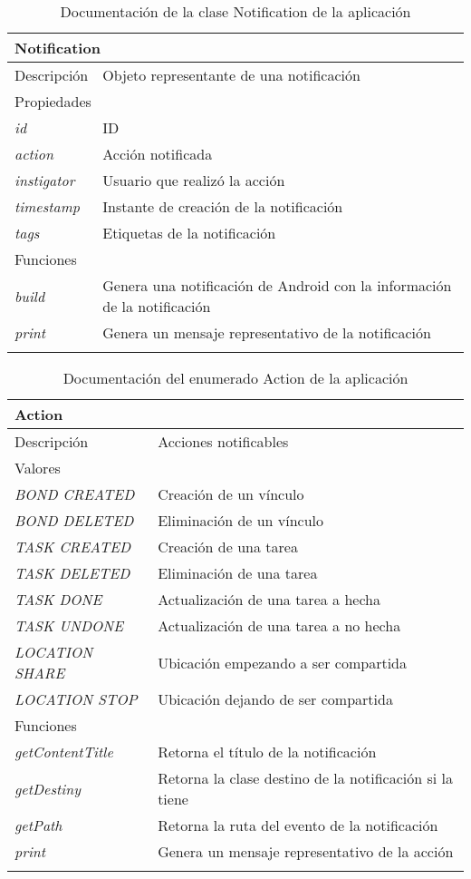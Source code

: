 \begin{longtable}{|p{} p{}|}
    \hline
    \multicolumn{2}{|l|}{\textbf{Notification}} \\ \hline \hline
    Descripción      & Objeto representante de una notificación \\ \hline
    \multicolumn{2}{|l|}{Propiedades} \\
    \emph{id}  & ID \\
    \emph{action}  & Acción notificada \\
    \emph{instigator} & Usuario que realizó la acción \\
    \emph{timestamp}  & Instante de creación de la notificación \\
    \emph{tags}  & Etiquetas de la notificación \\  \hline
    \multicolumn{2}{|l|}{Funciones} \\
    \emph{build}  & Genera una notificación de Android con la información de la notificación \\
    \emph{print}  & Genera un mensaje representativo de la notificación \\  \hline
    \caption{Documentación de la clase Notification de la aplicación}
    \label{dis:app:notification}
\end{longtable}

\begin{longtable}{|p{} p{}|}
    \hline
    \multicolumn{2}{|l|}{\textbf{Action}} \\ \hline \hline
    Descripción      & Acciones notificables \\ \hline
    \multicolumn{2}{|l|}{Valores} \\
    \emph{BOND CREATED}  & Creación de un vínculo  \\
    \emph{BOND DELETED}  & Eliminación de un vínculo  \\
    \emph{TASK CREATED}  & Creación de una tarea  \\
    \emph{TASK DELETED}  & Eliminación de una tarea  \\
    \emph{TASK DONE}  & Actualización de una tarea a hecha  \\
    \emph{TASK UNDONE}  & Actualización de una tarea a no hecha  \\
    \emph{LOCATION SHARE}  & Ubicación empezando a ser compartida  \\
    \emph{LOCATION STOP}  & Ubicación dejando de ser compartida  \\ \hline
    \multicolumn{2}{|l|}{Funciones} \\
    \emph{getContentTitle} & Retorna el título de la notificación \\
    \emph{getDestiny}  & Retorna la clase destino de la notificación si la tiene \\
    \emph{getPath}  & Retorna la ruta del evento de la notificación \\
    \emph{print}  & Genera un mensaje representativo de la acción \\  \hline
    \caption{Documentación del enumerado Action de la aplicación}
    \label{dis:app:action}
\end{longtable}


